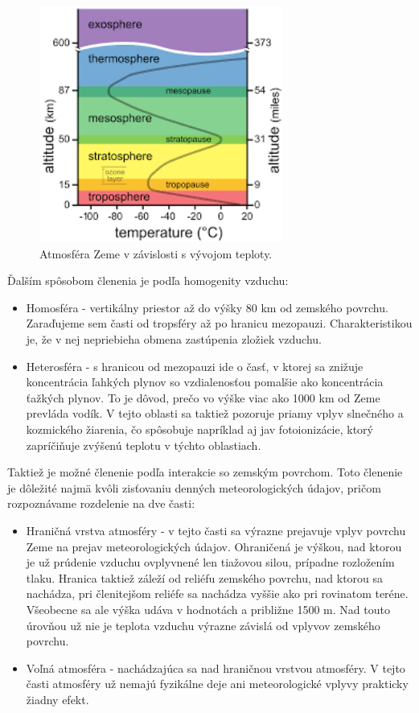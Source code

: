 \begin{figure}[!htbp]
  \centering
  \includegraphics[width=8cm]{img/atmosphere.png}
  \caption{Atmosféra Zeme v závislosti s vývojom teploty.}
  \label{numModel}
\end{figure}

Ďalším spôsobom členenia je podľa homogenity vzduchu: 
\begin{itemize}
  \item Homosféra - vertikálny priestor až do výšky 80 km od zemského povrchu. Zaraďujeme sem časti od tropsféry až po hranicu mezopauzi. Charakteristikou je, že v nej nepriebieha obmena zastúpenia zložiek vzduchu.
  \item Heterosféra - s hranicou od mezopauzi ide o časť, v ktorej sa znižuje koncentrácia ľahkých plynov so vzdialenosťou pomalšie ako koncentrácia ťažkých plynov. To je dôvod, prečo vo výške viac ako 1000 km od Zeme prevláda vodík. V tejto oblasti sa taktiež pozoruje priamy vplyv slnečného a kozmického žiarenia, čo spôsobuje napríklad aj jav fotoionizácie, ktorý zapríčiňuje zvýšenú teplotu v týchto oblastiach.
\end{itemize}

Taktiež je možné členenie podľa interakcie so zemským povrchom. Toto členenie je dôležité najmä kvôli zisťovaniu denných meteorologických údajov, pričom rozpoznávame rozdelenie na dve časti:

\begin{itemize}
  \item Hraničná vrstva atmosféry - v tejto časti sa výrazne prejavuje vplyv povrchu Zeme na prejav meteorologických údajov. Ohraničená je výškou, nad ktorou je už prúdenie vzduchu ovplyvnené len tiažovou silou, prípadne rozložením tlaku. Hranica taktiež záleží od reliéfu zemského povrchu, nad ktorou sa nachádza, pri členitejšom reliéfe sa nachádza vyššie ako pri rovinatom teréne. Všeobecne sa ale výška udáva v hodnotách a približne 1500 m. Nad touto úrovňou už nie je teplota vzduchu výrazne závislá od vplyvov zemského povrchu.
  \item Voľná atmosféra - nachádzajúca sa nad hraničnou vrstvou atmosféry. V tejto časti atmosféry už nemajú fyzikálne deje ani meteorologické vplyvy prakticky žiadny efekt.
\end{itemize}

